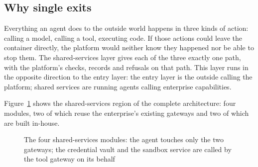 \subsection{Why single exits}

Everything an agent does to the outside world happens in three kinds of action: calling a model, calling a tool, executing code. If those actions could leave the container directly, the platform would neither know they happened nor be able to stop them. The shared-services layer gives each of the three exactly one path, with the platform's checks, records and refusals on that path. This layer runs in the opposite direction to the entry layer: the entry layer is the outside calling the platform; shared services are running agents calling enterprise capabilities.

Figure~\ref{fig:zoom-shared} shows the shared-services region of the complete architecture: four modules, two of which reuse the enterprise's existing gateways and two of which are built in-house.

\begin{figure}[htbp]
\centering
{}
\caption[The shared-services layer]{The four shared-services modules: the agent touches only the two gateways; the credential vault and the sandbox service are called by the tool gateway on its behalf}
\label{fig:zoom-shared}
\end{figure}

